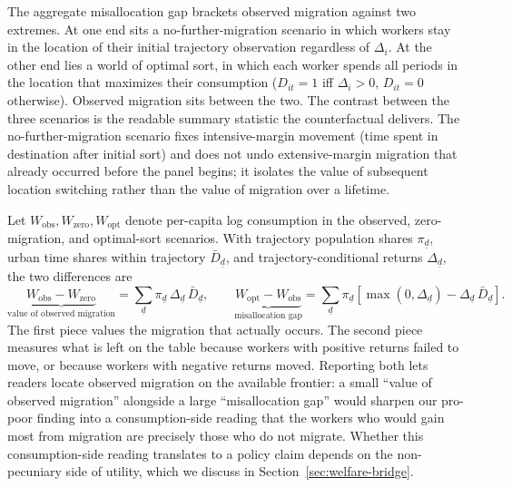 The aggregate misallocation gap brackets observed migration against two extremes.
At one end sits a no-further-migration scenario in which workers stay in the location of their initial trajectory observation regardless of $\Delta_i$.
At the other end lies a world of optimal sort, in which each worker spends all periods in the location that maximizes their consumption ($D_{it} = 1$ iff $\Delta_i > 0$, $D_{it} = 0$ otherwise).
Observed migration sits between the two.
The contrast between the three scenarios is the readable summary statistic the counterfactual delivers.
The no-further-migration scenario fixes intensive-margin movement (time spent in destination after initial sort) and does not undo extensive-margin migration that already occurred before the panel begins; it isolates the value of subsequent location switching rather than the value of migration over a lifetime.

Let $W_{\text{obs}}, W_{\text{zero}}, W_{\text{opt}}$ denote per-capita log consumption in the observed, zero-migration, and optimal-sort scenarios.
With trajectory population shares $\pi_{\underline{d}}$, urban time shares within trajectory $\bar{D}_{\underline{d}}$, and trajectory-conditional returns $\Delta_{\underline{d}}$, the two differences are
\begin{equation}\label{eq:misallocation-decomposition}
    \underbrace{W_{\text{obs}} - W_{\text{zero}}}_{\text{value of observed migration}} = \sum_{\underline{d}} \pi_{\underline{d}} \, \Delta_{\underline{d}} \, \bar{D}_{\underline{d}}, \qquad
    \underbrace{W_{\text{opt}} - W_{\text{obs}}}_{\text{misallocation gap}} = \sum_{\underline{d}} \pi_{\underline{d}} \left[\max(0, \Delta_{\underline{d}}) - \Delta_{\underline{d}} \, \bar{D}_{\underline{d}}\right].
\end{equation}
The first piece values the migration that actually occurs.
The second piece measures what is left on the table because workers with positive returns failed to move, or because workers with negative returns moved.
Reporting both lets readers locate observed migration on the available frontier: a small ``value of observed migration'' alongside a large ``misallocation gap'' would sharpen our pro-poor finding into a consumption-side reading that the workers who would gain most from migration are precisely those who do not migrate.
Whether this consumption-side reading translates to a policy claim depends on the non-pecuniary side of utility, which we discuss in Section~\ref{sec:welfare-bridge}.

